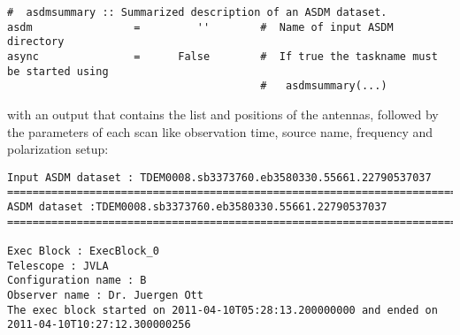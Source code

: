 \small

\begin{verbatim}
#  asdmsummary :: Summarized description of an ASDM dataset.
asdm                =         ''        #  Name of input ASDM directory
async               =      False        #  If true the taskname must be started using
                                        #   asdmsummary(...)
\end{verbatim}
\normalsize

with an output that contains the list and positions of the
antennas, followed by the parameters of each scan like observation
time, source name, frequency and polarization setup: 

\footnotesize
\begin{verbatim}
Input ASDM dataset : TDEM0008.sb3373760.eb3580330.55661.22790537037
========================================================================================
ASDM dataset :TDEM0008.sb3373760.eb3580330.55661.22790537037
========================================================================================

Exec Block : ExecBlock_0
Telescope : JVLA
Configuration name : B
Observer name : Dr. Juergen Ott
The exec block started on 2011-04-10T05:28:13.200000000 and ended on 2011-04-10T10:27:12.300000256


\end{verbatim}

